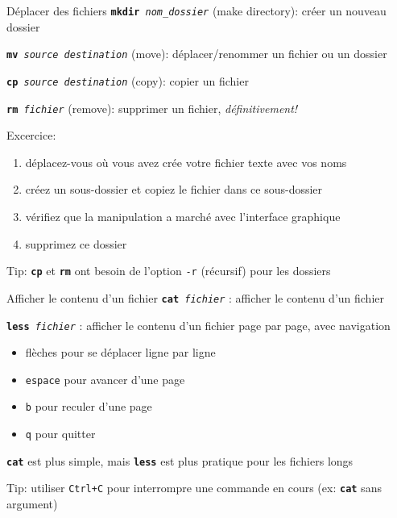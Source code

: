 \documentclass[
aspectratio=169 %
]{beamer}
\newcommand{\cmd}[1]{\texttt{\textbf{#1}}}
\newcommand{\args}[1]{\texttt{\textit{#1}}}
\begin{document}
\begin{frame}{Déplacer des fichiers}
    \cmd{mkdir}\args{ nom\_dossier} (make directory): créer un nouveau dossier
    \smallskip

    \cmd{mv}\args{ source destination} (move): déplacer/renommer un fichier ou
    un dossier
    \smallskip

    \cmd{cp}\args{ source destination} (copy): copier un fichier
    \smallskip

    \cmd{rm}\args{ fichier} (remove): supprimer un fichier,
    \textit{définitivement!}

    \bigskip
    Excercice:
    \begin{enumerate}
        \item déplacez-vous où vous avez crée votre fichier texte avec vos noms
        \item créez un sous-dossier et copiez le fichier dans ce sous-dossier
        \item vérifiez que la manipulation a marché avec l'interface graphique
        \item supprimez ce dossier
    \end{enumerate}
    \bigskip

    \alert{Tip:} \cmd{cp} et \cmd{rm} ont besoin de l'option \texttt{-r}
    (récursif) pour les dossiers
\end{frame}

\begin{frame}{Afficher le contenu d'un fichier}
    \cmd{cat}\args{ fichier} : afficher le contenu d'un fichier
    \bigskip

    \cmd{less}\args{ fichier} : afficher le contenu d'un fichier
    page par page, avec navigation
    \begin{itemize}
        \item flèches pour se déplacer ligne par ligne
        \item \texttt{espace} pour avancer d'une page
        \item \texttt{b} pour reculer d'une page
        \item \texttt{q} pour quitter
    \end{itemize}
    \bigskip

    \cmd{cat} est plus simple, mais \cmd{less} est plus pratique
    pour les fichiers longs

    \bigskip
    \alert{Tip:} utiliser \texttt{Ctrl+C} pour interrompre une commande en cours
    (ex: \cmd{cat} sans argument)
\end{frame}
\end{document}
